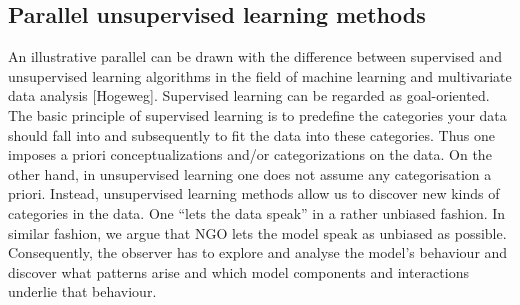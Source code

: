 \subsection{Parallel unsupervised learning methods}

An illustrative parallel can be drawn with the difference between supervised and unsupervised learning algorithms in the field of machine learning and multivariate data analysis [Hogeweg]. Supervised learning can be regarded as goal-oriented. The basic principle of supervised learning is to predefine the categories your data should fall into and subsequently to fit the data into these categories. Thus one imposes a priori conceptualizations and/or categorizations on the data. On the other hand, in unsupervised learning one does not assume any categorisation a priori. Instead, unsupervised learning methods allow us to discover new kinds of categories in the data. One “lets the data speak” in a rather unbiased fashion. In similar fashion, we argue that NGO lets the model speak as unbiased as possible. Consequently, the observer has to explore and analyse the model’s behaviour and discover what patterns arise and which model components and interactions underlie that behaviour.
  